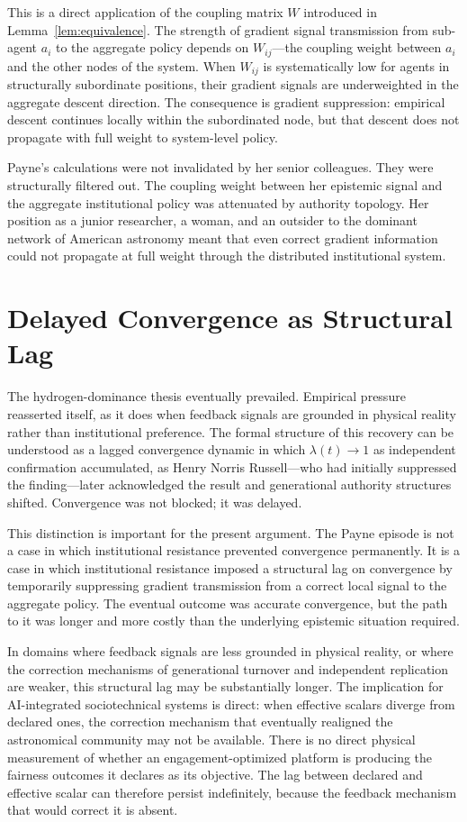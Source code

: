 \documentclass[12pt, oneside]{book}
\theoremstyle{plain}
\theoremstyle{definition}
\theoremstyle{remark}
\theoremstyle{definition}
\begin{document}
This is a direct application of the coupling matrix $W$ introduced in
Lemma~\ref{lem:equivalence}. The strength of gradient signal transmission from
sub-agent $a_i$ to the aggregate policy depends on $W_{ij}$---the coupling weight
between $a_i$ and the other nodes of the system. When $W_{ij}$ is systematically
low for agents in structurally subordinate positions, their gradient signals are
underweighted in the aggregate descent direction. The consequence is gradient
suppression: empirical descent continues locally within the subordinated node, but
that descent does not propagate with full weight to system-level policy.

Payne's calculations were not invalidated by her senior colleagues. They were
structurally filtered out. The coupling weight between her epistemic signal and the
aggregate institutional policy was attenuated by authority topology. Her position as
a junior researcher, a woman, and an outsider to the dominant network of American
astronomy meant that even correct gradient information could not propagate at full
weight through the distributed institutional system.

\section{Delayed Convergence as Structural Lag}

The hydrogen-dominance thesis eventually prevailed. Empirical pressure reasserted
itself, as it does when feedback signals are grounded in physical reality rather
than institutional preference. The formal structure of this recovery can be understood
as a lagged convergence dynamic in which $\lambda(t) \to 1$ as independent
confirmation accumulated, as Henry Norris Russell---who had initially suppressed the
finding---later acknowledged the result and generational authority structures shifted.
Convergence was not blocked; it was delayed.

This distinction is important for the present argument. The Payne episode is not
a case in which institutional resistance prevented convergence permanently. It is a
case in which institutional resistance imposed a structural lag on convergence by
temporarily suppressing gradient transmission from a correct local signal to the
aggregate policy. The eventual outcome was accurate convergence, but the path to it
was longer and more costly than the underlying epistemic situation required.

In domains where feedback signals are less grounded in physical reality, or where
the correction mechanisms of generational turnover and independent replication are
weaker, this structural lag may be substantially longer. The implication for
AI-integrated sociotechnical systems is direct: when effective scalars diverge from
declared ones, the correction mechanism that eventually realigned the astronomical
community may not be available. There is no direct physical measurement of whether
an engagement-optimized platform is producing the fairness outcomes it declares as
its objective. The lag between declared and effective scalar can therefore persist
indefinitely, because the feedback mechanism that would correct it is absent.
\end{document}
